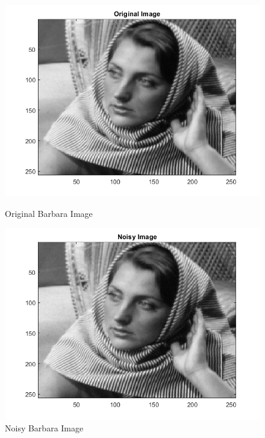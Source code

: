 \documentclass[12pt]{article}
\begin{document}
\begin{itemize}
\begin{enumerate}
    \begin{figure}[H]
        \centering
        \begin{minipage}{.45\textwidth}
            \centering
            \includegraphics[width=\linewidth]{Images/Q1_Original.png}
            \caption*{Original Barbara Image}
        \end{minipage}
        \begin{minipage}{.55\textwidth}
            \centering
            \includegraphics[width=\linewidth]{Images/Q1_Noisy.png}
            \caption*{Noisy Barbara Image}
        \end{minipage}
    \end{figure}
    

\end{enumerate}
\end{itemize}
\end{document}
